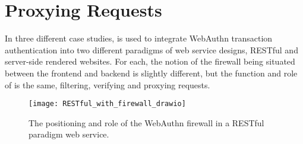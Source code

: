 


\section{Proxying Requests}\label{Sec:ProxyingRequests}

In three different case studies, \sys{} is used to integrate WebAuthn transaction authentication into two different paradigms of web service designs, RESTful and server-side rendered websites. For each, the notion of the firewall being situated between the frontend and backend is slightly different, but the function and role of \sys{} is the same, filtering, verifying and proxying requests. 

\begin{figure}[h]
  \centering
  \texttt{[image: RESTful\_with\_firewall\_drawio]}
  \caption{The positioning and role of the WebAuthn firewall in a RESTful paradigm web service.}
  \label{Fig:ProxyingRequestsRESTful}
\end{figure}


